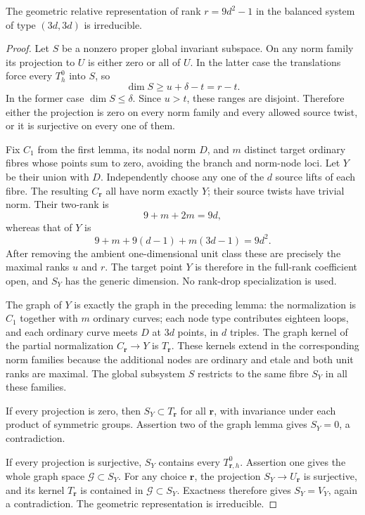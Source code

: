 \begin{proposition}
\label{prop:mixed-odd-balanced-irreducibility-candidate}
The geometric relative representation of rank $r=9d^2-1$
in the balanced system of type $(3d,3d)$ is irreducible.
\end{proposition}
\begin{proof}
Let $S$ be a nonzero proper global invariant subspace. On any
norm family its projection to $U$ is either zero or all of $U$.
In the latter case the translations force every $T_h^0$ into
$S$, so
\[
                         \dim S\geq u+\delta-t=r-t.
\]
In the former case $\dim S\leq\delta$. Since $u>t$, these
ranges are disjoint. Therefore either the projection is zero
on every norm family and every allowed source twist, or it
is surjective on every one of them.

Fix $C_1$ from the first lemma, its nodal norm $D$, and $m$
distinct target ordinary fibres whose points sum to zero,
avoiding the branch and norm-node loci. Let $Y$ be their union
with $D$. Independently choose any one of the $d$ source lifts
of each fibre. The resulting $C_{\mathbf r}$ all have norm
exactly $Y$; their source twists have trivial norm. Their
two-rank is
\[
                 9+m+2m=9d,
\]
whereas that of $Y$ is
\[
       9+m+9(d-1)+m(3d-1)=9d^2.
\]
After removing the ambient one-dimensional unit class these
are precisely the maximal ranks $u$ and $r$. The target point
$Y$ is therefore in the full-rank coefficient open, and $S_Y$
has the generic dimension. No rank-drop specialization is used.

The graph of $Y$ is exactly the graph in the preceding lemma:
the normalization is $C_1$ together with $m$ ordinary curves;
each node type contributes eighteen loops, and each ordinary
curve meets $D$ at $3d$ points, in $d$ triples. The graph kernel
of the partial normalization $C_{\mathbf r}\to Y$ is
$T_{\mathbf r}$. These kernels extend in the corresponding
norm families because the additional nodes are ordinary and
etale and both unit ranks are maximal. The global subsystem
$S$ restricts to the same fibre $S_Y$ in all these families.

If every projection is zero, then $S_Y\subset T_{\mathbf r}$
for all $\mathbf r$, with invariance under each product of
symmetric groups. Assertion two of the graph lemma gives
$S_Y=0$, a contradiction.

If every projection is surjective, $S_Y$ contains every
$T_{\mathbf r,h}^0$. Assertion one gives the whole graph
space $\mathcal G\subset S_Y$. For any choice $\mathbf r$,
the projection $S_Y\to U_{\mathbf r}$ is surjective, and its
kernel $T_{\mathbf r}$ is contained in $\mathcal G\subset S_Y$.
Exactness therefore gives $S_Y=V_Y$, again a contradiction. The geometric
representation is irreducible.
\end{proof}

